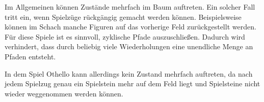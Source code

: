 Im Allgemeinen können Zustände mehrfach im Baum auftreten. Ein solcher Fall tritt ein, wenn Spielzüge rückgängig gemacht
werden können. Beispielsweise können im Schach manche Figuren auf das vorherige Feld zurückgestellt werden. Für diese
Spiele ist es sinnvoll, zyklische Pfade auszuschließen. Dadurch wird verhindert, dass durch beliebig viele
Wiederholungen eine unendliche Menge an Pfaden entsteht.
\cite[S.~75]{ai2010russel}

In dem Spiel Othello kann allerdings kein Zustand mehrfach auftreten, da nach jedem Spielzug genau ein Spielstein mehr
auf dem Feld liegt und Spielsteine nicht wieder weggenommen werden können.

